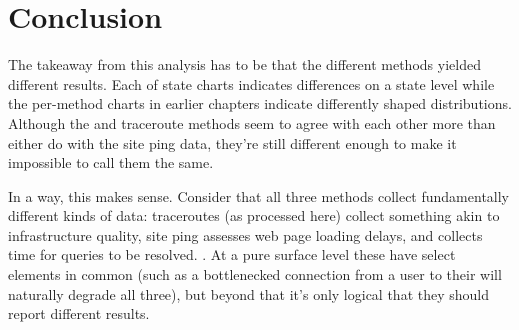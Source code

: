 \section{Conclusion}\label{sec:comparative-summary}

The takeaway from this analysis has to be that the different methods yielded different results. Each of state \kde charts indicates differences on a state level while the per-method \kde charts in earlier chapters indicate differently shaped distributions. Although the \dns and traceroute methods seem to agree with each other more than either do with the site ping data, they're still different enough to make it impossible to call them the same.

In a way, this makes sense. Consider that all three methods collect fundamentally different kinds of data: traceroutes (as processed here) collect something akin to infrastructure quality, site ping assesses web page loading delays, and \dns collects time for \dns queries to be resolved. . At a pure surface level these have select elements in common (such as a bottlenecked connection from a user to their \isp will naturally degrade all three), but beyond that it's only logical that they should report different results.
